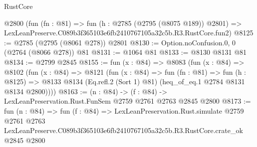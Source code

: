 \begin{lexlean}{RustCore}
\begin{coremodule}
    @2800
    (fun (fn : @81) =>
    fun (h : @2785 (@2795 (@8075 @189)) @2801) =>
    LexLeanPreserve.C089b3f365103e6fb2410767105a32c5b.R3.RustCore.fun2)
@8125 := @2785 (@2795 (@8061 @278)) @2801
@8130 := Option.noConfusion.{0, 0} (@2764 (@8066 @278)) @81
@8131 := @1064 @81
@8133 := @8130 @8131 @81
@8134 := @2799 @2845
@8155 := fun (x : @84) =>
  @8083
    (fun (x : @84) =>
    @8102
      (fun (x : @84) =>
      @8121
        (fun (x : @84) =>
        fun (fn : @81) =>
        fun (h : @8125) =>
        @8133 @8134 (Eq.refl.{2} (Sort 1) @81) (heq_of_eq.{1} @2784 @8131 @8134 @2800))))
@8163 := (n : @84) -> (f : @84) -> LexLeanPreservation.Rust.FunSem @2759 @2761 @2763 @2845 @2800
@8173 := fun (n : @84) =>
  fun (f : @84) =>
  LexLeanPreservation.Rust.simulate
    @2759
    @2761
    @2763
    LexLeanPreserve.C089b3f365103e6fb2410767105a32c5b.R3.RustCore.crate_ok
    @2845
    @2800
\end{coremodule}
\end{lexlean}
